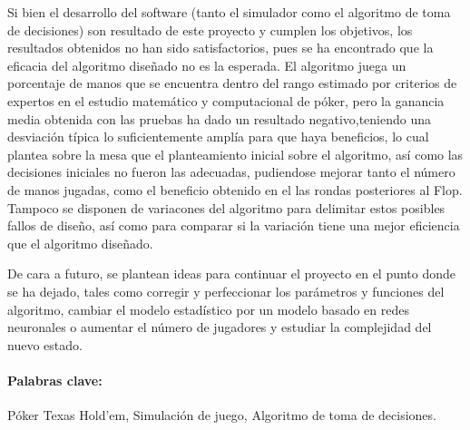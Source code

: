 Si bien el desarrollo del software (tanto el simulador como el algoritmo de toma de decisiones) son resultado de este proyecto y cumplen los objetivos, los resultados obtenidos no han sido satisfactorios, pues se ha encontrado que la eficacia del algoritmo diseñado no es la esperada.  El algoritmo juega un porcentaje de manos  que se encuentra dentro del rango estimado por criterios de expertos en el estudio matemático y computacional de póker, pero la ganancia media obtenida con las pruebas ha dado un resultado negativo,teniendo una desviación típica lo suficientemente amplía para que haya beneficios, lo cual plantea sobre la mesa que el planteamiento inicial sobre el algoritmo, así como las decisiones iniciales no fueron las adecuadas, pudiendose mejorar tanto el número de manos jugadas, como el beneficio obtenido en el las rondas posteriores al Flop. Tampoco se disponen de variacones del algoritmo para delimitar estos posibles fallos de diseño, así como para comparar si la variación tiene una mejor eficiencia que el algoritmo diseñado. 

De cara a futuro, se plantean ideas para continuar el proyecto en el punto donde se ha dejado, tales como corregir y perfeccionar los parámetros y funciones del algoritmo, cambiar el modelo estadístico por un modelo basado en redes neuronales o aumentar el número de jugadores y estudiar la complejidad del nuevo estado.


\paragraph{Palabras clave:} Póker Texas Hold'em, Simulación de juego, Algoritmo de toma de decisiones.


